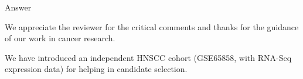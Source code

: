 \documentclass[preprint,12pt]{elsarticle}
\newenvironment{MyColorPar}[1]{%
    \leavevmode\color{#1}\ignorespaces%
}{%
}%
\begin{document}
%
\begin{MyColorPar}{blue}
Answer


We appreciate the reviewer for the critical comments and thanks for the guidance of our work in cancer research.



We have introduced an independent HNSCC cohort (GSE65858, with RNA-Seq expression data) for helping in candidate selection.


\end{MyColorPar}
\end{document}
